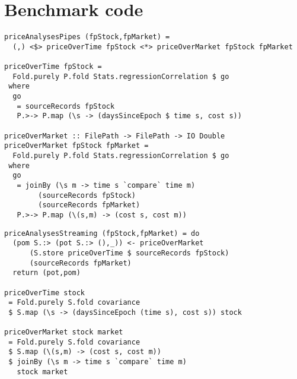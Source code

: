 \chapter{Benchmark code}
\label{app:Benchmarks}

% 
% 

\begin{lstlisting}[float,label=l:a:bench:priceAnalysesPipes,caption=Pipes two-pass implementation of \Hs/priceAnalyses/]
priceAnalysesPipes (fpStock,fpMarket) =
  (,) <$> priceOverTime fpStock <*> priceOverMarket fpStock fpMarket

priceOverTime fpStock = 
  Fold.purely P.fold Stats.regressionCorrelation $ go
 where
  go
   = sourceRecords fpStock
   P.>-> P.map (\s -> (daysSinceEpoch $ time s, cost s)) 

priceOverMarket :: FilePath -> FilePath -> IO Double
priceOverMarket fpStock fpMarket = 
  Fold.purely P.fold Stats.regressionCorrelation $ go
 where
  go
   = joinBy (\s m -> time s `compare` time m)
        (sourceRecords fpStock)
        (sourceRecords fpMarket)
   P.>-> P.map (\(s,m) -> (cost s, cost m)) 
\end{lstlisting}

\begin{lstlisting}[float,label=l:a:bench:priceAnalysesStreaming,caption=Streaming implementation of \Hs/priceAnalyses/]
priceAnalysesStreaming (fpStock,fpMarket) = do
  (pom S.:> (pot S.:> (),_)) <- priceOverMarket
      (S.store priceOverTime $ sourceRecords fpStock)
      (sourceRecords fpMarket)
  return (pot,pom)

priceOverTime stock
 = Fold.purely S.fold covariance
 $ S.map (\s -> (daysSinceEpoch (time s), cost s)) stock

priceOverMarket stock market
 = Fold.purely S.fold covariance
 $ S.map (\(s,m) -> (cost s, cost m))
 $ joinBy (\s m -> time s `compare` time m)
   stock market
\end{lstlisting}

